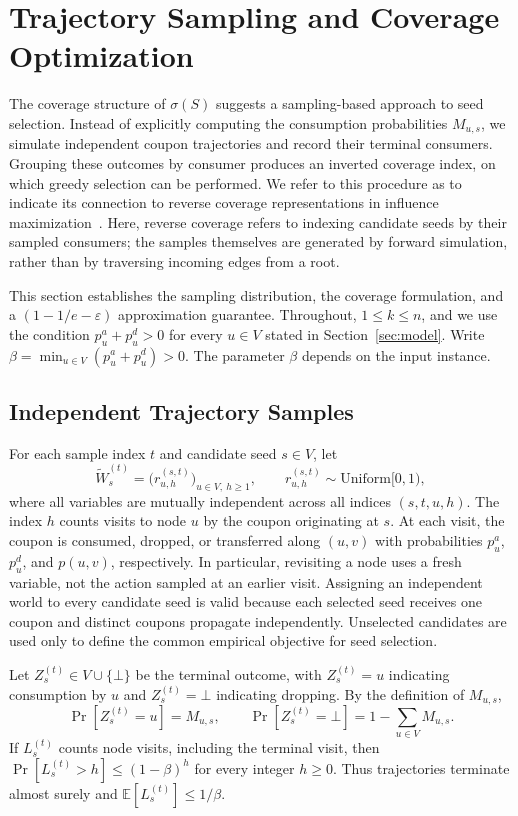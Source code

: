 \section{Trajectory Sampling and Coverage Optimization}
\label{sec:algo}

The coverage structure of $\sigma(S)$ suggests a sampling-based approach
to seed selection. Instead of explicitly computing the consumption
probabilities $M_{u,s}$, we simulate independent coupon trajectories and
record their terminal consumers. Grouping these outcomes by consumer
produces an inverted coverage index, on which greedy selection can be
performed. We refer to this procedure as \CIMRIS{} to indicate its
connection to reverse coverage representations in influence
maximization~\cite{borgs2014maximizing,tang2015influence}.
Here, reverse coverage refers to indexing candidate seeds by their
sampled consumers; the samples themselves are generated by forward
simulation, rather than by traversing incoming edges from a root.

This section establishes the sampling distribution, the coverage
formulation, and a $(1-1/e-\varepsilon)$ approximation guarantee.
Throughout, $1\le k\le n$, and we use the condition
$p_u^a+p_u^d>0$ for every $u\in V$ stated in
Section~\ref{sec:model}. Write
$\beta=\min_{u\in V}(p_u^a+p_u^d)>0$.
The parameter $\beta$ depends on the input instance.

\subsection{Independent Trajectory Samples}
\label{sec:source-worlds}

For each sample index $t$ and candidate seed $s\in V$, let
\[
  \widetilde W_s^{(t)}
  =\bigl(r_{u,h}^{(s,t)}\bigr)_{u\in V,\ h\ge1},
  \qquad r_{u,h}^{(s,t)}\sim\mathrm{Uniform}[0,1),
\]
where all variables are mutually independent across all indices
$(s,t,u,h)$. The index $h$ counts visits to node $u$ by the coupon
originating at $s$. At each visit, the coupon is consumed, dropped,
or transferred along $(u,v)$ with probabilities $p_u^a$, $p_u^d$,
and $p(u,v)$, respectively. In particular, revisiting a node uses
a fresh variable, not the action sampled at an earlier visit.
Assigning an independent world to every candidate seed is valid
because each selected seed receives one coupon and distinct coupons
propagate independently. Unselected candidates are used only to
define the common empirical objective for seed selection.

Let $Z_s^{(t)}\in V\cup\{\bot\}$ be the terminal outcome, with
$Z_s^{(t)}=u$ indicating consumption by $u$ and $Z_s^{(t)}=\bot$
indicating dropping. By the definition of $M_{u,s}$,
\begin{equation}
\label{eq:endpoint-law}
  \Pr[Z_s^{(t)}=u]=M_{u,s},\qquad
  \Pr[Z_s^{(t)}=\bot]=1-\sum_{u\in V}M_{u,s}.
\end{equation}
If $L_s^{(t)}$ counts node visits, including the terminal visit,
then $\Pr[L_s^{(t)}>h]\le(1-\beta)^h$ for every integer $h\ge0$.
Thus trajectories terminate almost surely and
$\mathbb E[L_s^{(t)}]\le1/\beta$.

